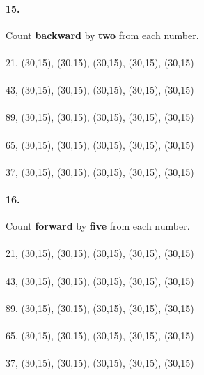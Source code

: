 \documentclass[12pt]{article}
\begin{document}
\bigskip

\paragraph{15.}
Count \textbf{backward} by \textbf{two} from each number. \\
\\
21, \framebox(30,15){}, \framebox(30,15){}, \framebox(30,15){}, \framebox(30,15){}, \framebox(30,15){}
\\
\\
43, \framebox(30,15){}, \framebox(30,15){}, \framebox(30,15){}, \framebox(30,15){}, \framebox(30,15){}
\\
\\
89, \framebox(30,15){}, \framebox(30,15){}, \framebox(30,15){}, \framebox(30,15){}, \framebox(30,15){}
\\
\\
65, \framebox(30,15){}, \framebox(30,15){}, \framebox(30,15){}, \framebox(30,15){}, \framebox(30,15){}
\\
\\
37, \framebox(30,15){}, \framebox(30,15){}, \framebox(30,15){}, \framebox(30,15){}, \framebox(30,15){}

\bigskip

\paragraph{16.}
Count \textbf{forward} by \textbf{five} from each number. \\
\\
21, \framebox(30,15){}, \framebox(30,15){}, \framebox(30,15){}, \framebox(30,15){}, \framebox(30,15){}
\\
\\
43, \framebox(30,15){}, \framebox(30,15){}, \framebox(30,15){}, \framebox(30,15){}, \framebox(30,15){}
\\
\\
89, \framebox(30,15){}, \framebox(30,15){}, \framebox(30,15){}, \framebox(30,15){}, \framebox(30,15){}
\\
\\
65, \framebox(30,15){}, \framebox(30,15){}, \framebox(30,15){}, \framebox(30,15){}, \framebox(30,15){}
\\
\\
37, \framebox(30,15){}, \framebox(30,15){}, \framebox(30,15){}, \framebox(30,15){}, \framebox(30,15){}

\bigskip
\end{document}
